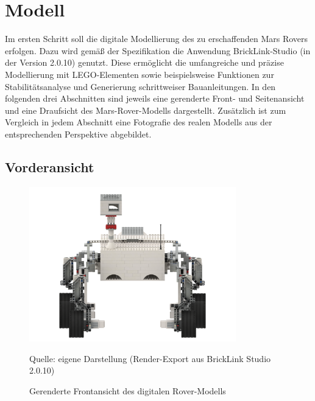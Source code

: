 \chapter{Modell}
\label{chp:modell}

Im ersten Schritt soll die digitale Modellierung des zu erschaffenden Mars Rovers erfolgen.
Dazu wird gemäß der Spezifikation die Anwendung BrickLink-Studio (in der Version 2.0.10) genutzt.
Diese ermöglicht die umfangreiche und präzise Modellierung mit LEGO-Elementen sowie beispielsweise Funktionen zur Stabilitätsanalyse und Generierung schrittweiser Bauanleitungen.
In den folgenden drei Abschnitten sind jeweils eine gerenderte Front- und Seitenansicht und eine Draufsicht des Mars-Rover-Modells dargestellt.
Zusätzlich ist zum Vergleich in jedem Abschnitt eine Fotografie des realen Modells aus der entsprechenden Perspektive abgebildet.

\section{Vorderansicht}
\label{sec:voderansicht}


\begin{figure}
	\centering
	\includegraphics[width=0.8\textwidth]{../Images/20200425_Mars_Rover_V5.png}
	\vspace{0.5em}
	\parbox[c]{0.8\linewidth}{\footnotesize
		\centering
		\vspace{1em}
		Quelle: eigene Darstellung (Render-Export aus BrickLink Studio 2.0.10)
	}
	\caption{Gerenderte Frontansicht des digitalen Rover-Modells}
	\label{fig:roverfrontrender}
\end{figure}

